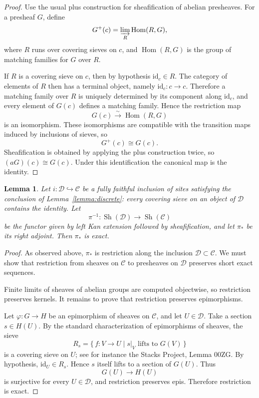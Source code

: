 \documentclass{article}
\newtheorem{lemma}[theorem]{Lemma}
\theoremstyle{remark}
\begin{document}
\begin{proof}
Use the usual plus construction for sheafification of abelian
presheaves.  For a presheaf \(G\), define
\[
G^+(c)=\varinjlim_{R} \operatorname{Hom}(R,G),
\]
where \(R\) runs over covering sieves on \(c\), and
\(\operatorname{Hom}(R,G)\) is the group of matching families for
\(G\) over \(R\).

If \(R\) is a covering sieve on \(c\), then by hypothesis
\(\mathrm{id}_c\in R\).  The category of elements of \(R\) then has a
terminal object, namely \(\mathrm{id}_c:c\to c\).  Therefore a matching
family over \(R\) is uniquely determined by its component along
\(\mathrm{id}_c\), and every element of \(G(c)\) defines a matching
family.  Hence the restriction map
\[
G(c)\xrightarrow{\sim}\operatorname{Hom}(R,G)
\]
is an isomorphism.  These isomorphisms are compatible with the
transition maps induced by inclusions of sieves, so
\[
G^+(c)\cong G(c).
\]
Sheafification is obtained by applying the plus construction twice, so
\((aG)(c)\cong G(c)\).  Under this identification the canonical map is
the identity.
\end{proof}

\begin{lemma}\label{lemma:pi-star-exact}
Let \(i:\mathcal D\hookrightarrow \mathcal C\) be a fully faithful
inclusion of sites satisfying the conclusion of
Lemma~\ref{lemma:discrete}: every covering sieve on an object of
\(\mathcal D\) contains the identity.  Let
\[
\pi^{-1}:\operatorname{Sh}(\mathcal D)\to \operatorname{Sh}(\mathcal C)
\]
be the functor given by left Kan extension followed by sheafification,
and let \(\pi_\ast\) be its right adjoint.  Then \(\pi_\ast\) is exact.
\end{lemma}

\begin{proof}
As observed above, \(\pi_\ast\) is restriction along the inclusion
\(\mathcal D\subset\mathcal C\).  We must show that restriction from
sheaves on \(\mathcal C\) to presheaves on \(\mathcal D\) preserves
short exact sequences.

Finite limits of sheaves of abelian groups are computed objectwise, so
restriction preserves kernels.  It remains to prove that restriction
preserves epimorphisms.

Let \(\varphi:G\to H\) be an epimorphism of sheaves on \(\mathcal C\),
and let \(U\in\mathcal D\).  Take a section \(s\in H(U)\).  By the
standard characterization of epimorphisms of sheaves, the sieve
\[
R_s=\{\,f:V\to U \mid s|_V \text{ lifts to } G(V)\,\}
\]
is a covering sieve on \(U\); see for instance the Stacks Project,
Lemma 00ZG.  By hypothesis, \(\mathrm{id}_U\in R_s\).  Hence \(s\)
itself lifts to a section of \(G(U)\).  Thus
\[
G(U)\longrightarrow H(U)
\]
is surjective for every \(U\in\mathcal D\), and restriction preserves
epis.  Therefore restriction is exact.
\end{proof}
\end{document}
